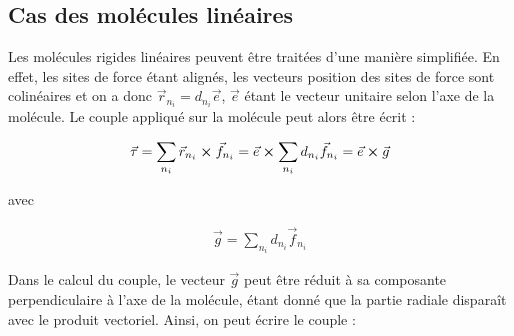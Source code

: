 \documentclass[12pt]{article}
\begin{document}






    \subsection{Cas des molécules linéaires}
    
Les molécules rigides linéaires peuvent être traitées d'une manière simplifiée. En effet, les sites de force étant alignés, les vecteurs position des sites de force sont colinéaires et on a donc $\vec{r}_{n_i}=d_{n_i}\vec{e}$, $\vec{e}$ étant le vecteur unitaire selon l'axe de la molécule. Le couple appliqué sur la molécule peut alors être écrit :

\begin{eqnarray}
\vec{\tau}=\sum_{n_i} \vec{r}_{n_i}\boldsymbol\times \vec{f}_{n_i}=\vec{e}\boldsymbol\times \sum_{n_i}d_{n_i}\vec{f}_{n_i}=\vec{e}\boldsymbol\times\vec{g}
\end{eqnarray}

avec 

\begin{eqnarray}
\vec{g}=\sum_{n_i}d_{n_i}\vec{f}_{n_i}
\end{eqnarray}

Dans le calcul du couple, le vecteur $\vec{g}$ peut être réduit à sa composante perpendiculaire à l'axe de la molécule, étant donné que la partie radiale disparaît avec le produit vectoriel. Ainsi, on peut écrire le couple :
\end{document}
